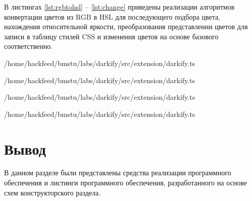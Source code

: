В листингах \ref{lst:rgbtohsl} -- \ref{lst:change} приведены реализации алгоритмов конвертации цветов из RGB в HSL для последующего подбора цвета, нахождения относительной яркости, преобразования представлении цветов для записи в таблицу стилей CSS и изменения цветов на основе базового соответственно. 

\begin{lstinputlisting}[
	caption={Реализация алгоритма конвертации цвета из RGB в HSL},
	label={lst:rgbtohsl},
	style={ES6},
	linerange={35-76},
	]{/home/hackfeed/bmstu/labs/darkify/src/extension/darkify.ts}
\end{lstinputlisting}

\begin{lstinputlisting}[
	caption={Реализация алгоритма нахождения относительной яркости},
	label={lst:luminance},
	style={ES6},
	linerange={77-88},
	]{/home/hackfeed/bmstu/labs/darkify/src/extension/darkify.ts}
\end{lstinputlisting}

\begin{lstinputlisting}[
	caption={Реализация алгоритмов нахождения преобразования представлений цветов},
	label={lst:translate},
	style={ES6},
	linerange={13-34},
	]{/home/hackfeed/bmstu/labs/darkify/src/extension/darkify.ts}
\end{lstinputlisting}

\begin{lstinputlisting}[
	caption={Реализация алгоритма подбора цветов на основе базовго},
	label={lst:change},
	style={ES6},
	linerange={97-151},
	]{/home/hackfeed/bmstu/labs/darkify/src/extension/darkify.ts}
\end{lstinputlisting}

\section*{Вывод}

В данном разделе были представлены средства реализации программного обеспечения и листинги программного обеспечения, разработанного на основе схем конструкторского раздела.
